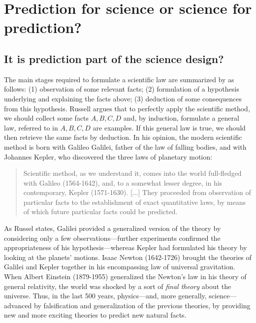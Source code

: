 \documentclass{statsoc}
\begin{document}
\section{Prediction for science or science for prediction?}
\label{sec:pred}

\subsection{It is prediction part of the science design?}

\color{black}

The main stages required to formulate a scientific law are summarized by \cite{russell2017scientific} as follows:
(1) observation of some relevant facts;
(2) formulation of a hypothesis underlying and explaining the facts above;
(3) deduction of some consequences from this hypothesis.
Russell argues that to perfectly apply the scientific method, we should collect some facts $A, B, C,D$ and, by induction, formulate a general law, referred to in $A, B, C, D$ are examples. If this general law is true, we should then retrieve the same facts by deduction.  
In his opinion, the modern scientific method is born with Galileo Galilei, father of the law of falling bodies, and with Johannes Kepler, who discovered the three laws of planetary motion:
 \begin{quote}
Scientific method, as we understand it, comes into the
world full-fledged with Galileo (1564-1642), and, to a
somewhat lesser degree, in his contemporary, Kepler
(1571-1630). [...] They proceeded from observation of
particular facts to the establishment of exact quantitative
laws, by means of which future particular facts could be
predicted.
\end{quote}
%
As Russel states, Galilei provided a generalized version of the theory by considering only a few observations---further experiments confirmed the appropriateness of his hypothesis---whereas Kepler had formulated his theory by looking at the planets' motions. Isaac Newton (1642-1726) brought the theories of Galilei and Kepler together in his encompassing 
law of universal gravitation. When Albert Einstein (1879-1955) generalized the Newton's law in his theory of general relativity, the world was shocked by a sort of \emph{final 
theory} about the universe. Thus, in the last 500 years, physics---and, more generally, science---advanced by falsification and generalization of the previous theories, by providing new and more exciting theories to predict new natural facts.
\end{document}

